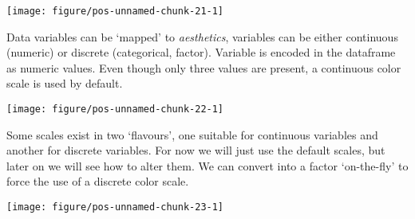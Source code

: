 \documentclass[paper=a4,headsepline,BCOR=12mm,twoside,open=right,%
titlepage,headings=small,fontsize=10pt,index=totoc,bibliography=totoc,%
captions=tableheading,captions=nooneline]{scrbook}\usepackage{knitr}
\begin{document}
\begin{knitrout}\footnotesize
{}\color{fgcolor}\begin{kframe}
\begin{alltt}
  \hlopt{+}
  \hlstd{()}
\end{alltt}
\end{kframe}

{\centering \texttt{[image: figure/pos-unnamed-chunk-21-1]} 

}



\end{knitrout}

Data variables can be `mapped' to \textit{aesthetics}, variables can be either continuous (numeric) or discrete (categorical, factor). Variable  is encoded in the  dataframe as numeric values. Even though only three values are present, a continuous color scale is used by default.

\begin{knitrout}\footnotesize
{}\color{fgcolor}\begin{kframe}
\begin{alltt}
\hlstd{(} 
       \hlstd{(}      \hlopt{+}
  \hlstd{()}
\end{alltt}
\end{kframe}

{\centering \texttt{[image: figure/pos-unnamed-chunk-22-1]} 

}



\end{knitrout}

Some scales exist in two `flavours', one suitable for continuous variables and another for discrete variables. For now we will just use the default scales, but later on we will see how to alter them. We can convert  into a factor `on-the-fly' to force the use of a discrete color scale.

\begin{knitrout}\footnotesize
{}\color{fgcolor}\begin{kframe}
\begin{alltt}
\hlstd{(} 
       \hlstd{(}     \hlstd{=}  \hlopt{+}
  \hlstd{()}
\end{alltt}
\end{kframe}

{\centering \texttt{[image: figure/pos-unnamed-chunk-23-1]} 

}



\end{knitrout}
\end{document}
